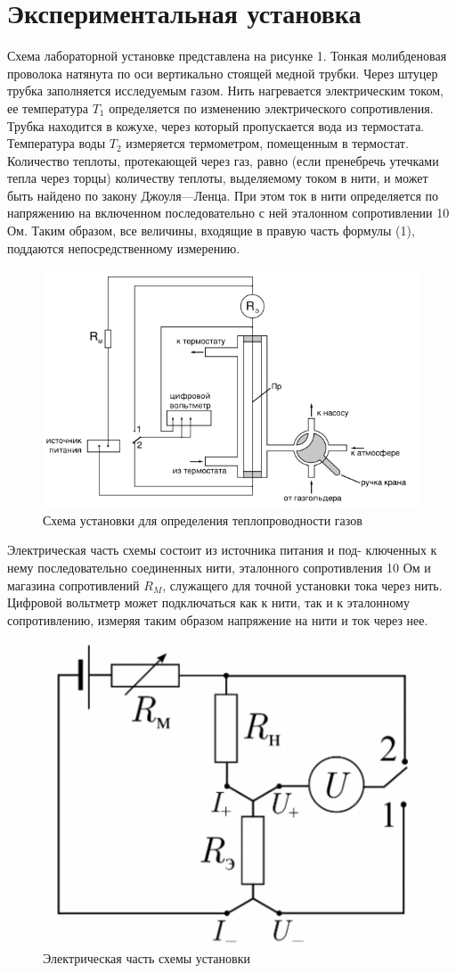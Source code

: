 \documentclass[12pt,a4paper]{article}
\begin{document}
 \section{Экспериментальная установка}
 Схема лабораторной установке представлена на рисунке 1. Тонкая молибденовая проволока натянута по оси вертикально стоящей медной трубки. Через штуцер трубка заполняется исследуемым газом. Нить нагревается электрическим током, ее температура $T_1$ определяется по изменению электрического сопротивления. Трубка находится в кожухе, через который пропускается вода из термостата. Температура воды $T_2$ измеряется термометром, помещенным в термостат. Количество теплоты,
протекающей через газ, равно (если пренебречь утечками тепла через торцы) количеству теплоты, выделяемому током в нити, и может быть найдено по закону Джоуля—Ленца. При этом ток в нити определяется по напряжению на включенном последовательно с ней эталонном сопротивлении 10 Ом. Таким образом, все величины, входящие в правую часть формулы (1), поддаются непосредственному измерению. \par
\newpage
\begin{figure}[h!]
    \centering
    \includegraphics[width=12 cm]{setup.png}
    \caption{Схема установки для определения теплопроводности газов}
    \label{fig:vac}
\end{figure}

Электрическая часть схемы состоит из источника питания и под-
ключенных к нему последовательно соединенных нити, эталонного
сопротивления 10 Ом и магазина сопротивлений $R_M$, служащего для
точной установки тока через нить. Цифровой вольтметр может подключаться как к нити, так и к эталонному сопротивлению, измеряя
таким образом напряжение на нити и ток через нее.

\begin{figure}[h!]
    \centering
    \includegraphics[width=7 cm]{electr.png}
    \caption{Электрическая часть схемы установки}
    \label{fig:elect}
\end{figure}
\end{document}
